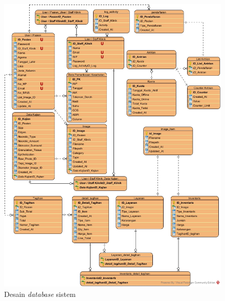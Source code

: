 \begin{enumerate}
	\begin{figure}[H]
		\centering
		\includegraphics[width=14cm]{diagram/WCare Webapp Rev Fix.jpg}
		\caption{Desain \emph{database} sistem} 
		\label{Gambar:usecaseadminjurnalpertama}
	\end{figure}
	
\end{enumerate}

